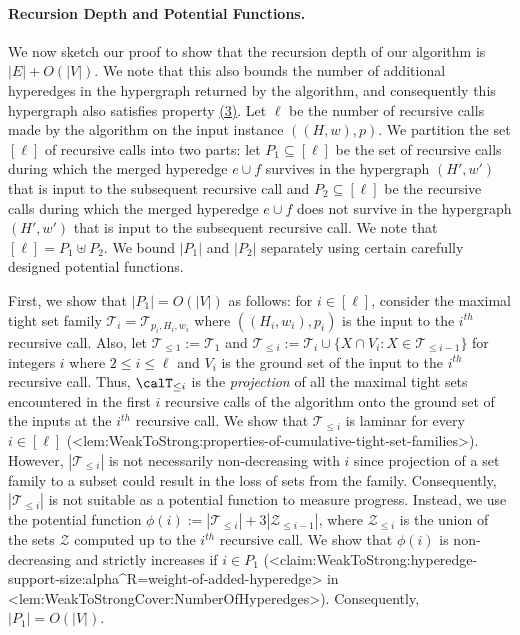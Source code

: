 \documentclass{article}
\def\Cref#1{<#1>}%
\newcommand{\zeros}{\ensuremath{\mathcal{Z}}\xspace}
\newcommand{\shubhang}[1]{{\color{blue}[{\tiny Shubhang: \bf #1}]\marginpar{\color{blue}*}}}
\begin{document}
\paragraph{Recursion Depth and Potential Functions.} We now sketch our proof to show that the recursion depth of our algorithm is $|E|+O(|V|)$. We note that this also bounds the number of additional hyperedges in the hypergraph returned by the algorithm, and consequently this hypergraph also satisfies property \hyperlink{WeakToStrong(3)}{(3)}. Let $\ell$ be the number of recursive calls made by the algorithm on the input instance $((H, w), p)$. 
We partition 
the set $[\ell]$ of recursive calls into two parts: let $P_1\subseteq [\ell]$ be the set of recursive calls during which 
the merged hyperedge $e\cup f$ survives in the hypergraph $(H', w')$ that is input to the subsequent recursive call and 
$P_2\subseteq [\ell]$ be the recursive calls during which 
the merged hyperedge $e\cup f$ does not survive in the hypergraph $(H', w')$ that is input to the subsequent recursive call. 
We note that $[\ell]=P_1\uplus P_2$. We bound $|P_1|$ and $|P_2|$ separately using certain carefully designed potential functions.

First, we show that $|P_1|=O(|V|)$ as follows: for $i\in [\ell]$, consider the maximal tight set family $\mathcal{T}_i=\mathcal{T}_{p_i, H_i, w_i}$ where $((H_i, w_i), p_i)$ is the input to the $i^{th}$ recursive call. Also, let $\mathcal{T}_{\le 1}:=\mathcal{T}_1$ and $\mathcal{T}_{\le i}:=\mathcal{T}_{i}\cup \{X\cap V_i: X\in \mathcal{T}_{\le i-1}\}$ for integers $i$ where $2 \le i\le \ell$ and $V_i$ is the ground set of the input to the $i^{th}$ recursive call. Thus, $\calT_{\leq i}$ is the \emph{projection} of all the maximal tight sets encountered in the first $i$ recursive calls of the algorithm onto the ground set of the inputs at the $i^{th}$ recursive call. We show that $\mathcal{T}_{\le i}$ is laminar for every $i\in [\ell]$ (\Cref{lem:WeakToStrong:properties-of-cumulative-tight-set-families}). 
However, $|\mathcal{T}_{\le i}|$ is not necessarily non-decreasing with $i$ since projection of a set family to a subset could result in the loss of sets from the family. Consequently, $|\mathcal{T}_{\le i}|$ is not suitable as a potential function to measure progress. Instead, we use the potential function $\phi(i):=|\mathcal{T}_{\le i}|+3|\zeros_{\le i-1}|$, where $\zeros_{\le i}$ is the union of the sets $\zeros$ computed up to the $i^{th}$ recursive call. We show that $\phi(i)$ is non-decreasing and strictly increases if $i\in P_1$ (\Cref{claim:WeakToStrong:hyperedge-support-size:alpha^R=weight-of-added-hyperedge} in \Cref{lem:WeakToStrongCover:NumberOfHyperedges}). Consequently, $|P_1|=O(|V|)$.
\end{document}
